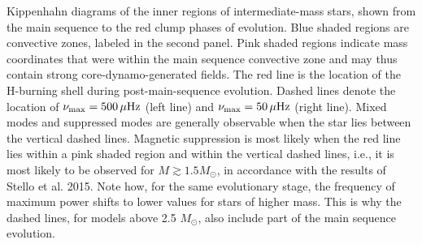 \label{fig:DipoleHist}
Kippenhahn diagrams of the inner regions of intermediate-mass stars, shown from the main sequence to the red clump phases of evolution. Blue shaded regions are convective zones, labeled in the second panel. Pink shaded regions indicate mass coordinates that were within the main sequence convective zone and may thus contain strong core-dynamo-generated fields. The red line is the location of the H-burning shell during post-main-sequence evolution. Dashed lines denote the location of $\nu_{\rm max} = 500 \, \mu{\rm Hz}$ (left line) and $\nu_{\rm max} = 50 \, \mu{\rm Hz}$ (right line). Mixed modes and suppressed modes are generally observable when the star lies between the vertical dashed lines. Magnetic suppression is most likely when the red line lies within a pink shaded region and within the vertical dashed lines, i.e., it is most likely to be observed for $M \gtrsim 1.5 M_\odot$, in accordance with the results of Stello et al. 2015. Note how, for the same evolutionary stage, the frequency of maximum power shifts to lower values for stars of higher mass.  This is why the dashed lines, for models above 2.5 $M_\odot$, also include part of the main sequence evolution.
  